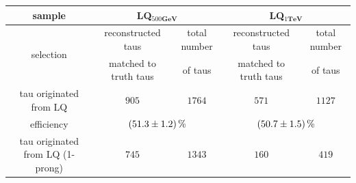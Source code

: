 	\begin{table}
		\centering
                \footnotesize
                \renewcommand{\arraystretch}{1.2}
		\begin{tabular*}{\linewidth}{@{\extracolsep{\fill}}ccccc}
		\hline
		\hline
		 \textbf{sample}  & \multicolumn{2}{c}{\textbf{LQ$_{500\textbf{GeV}}$}}  & \multicolumn{2}{c}{\textbf{LQ$_{1\textbf{TeV}}$}} 
		\\
		\hline
		\multirow{2}{*}{selection}  & reconstructed taus       & total number  & reconstructed taus       & total number 
		\\
                & matched to truth taus & of taus       & matched to truth taus & of taus
                \\
		\hline
                tau originated from LQ& $905$        & $1764$         & $571$          & $1127$
		\\
		efficiency                  & \multicolumn{2}{c}{$\SI{51.3\pm 1.2}{\percent}$}   & \multicolumn{2}{c}{$\SI{50.7\pm 1.5}{\percent}$}
		\\
		\hline
                tau originated from LQ (1-prong)& $745$        & $1343$         & $160$          & $419$
		\\

\end{tabular*}
\end{table}
